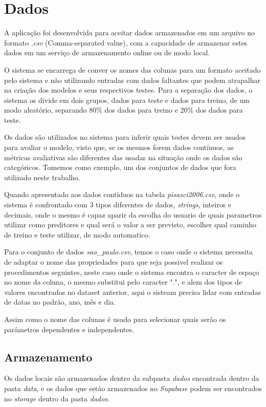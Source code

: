 \documentclass[
    12pt,               %
    openright,          %
    oneside,            %
    a4paper,            %
    english,            %
    brazil              %
    ]{abntex2}
\begin{document}
\section{Dados}

A aplicação foi desenvolvida para aceitar dados armazenados em um arquivo no formato \textit{.csv} (Comma-separated value), com a 
capacidade de armazenar estes dados em um serviço de armazenamento online ou de modo local.

O sistema se encarrega de conver os nomes das colunas para um formato aceitado pelo sistema e não utilizando entradas com dados 
faltantes que podem atrapalhar na criação dos modelos e seus respectivos testes. Para a separação dos dados, o sistema os divide 
em dois grupos, dados para teste e dados para treino, de um modo aleatório, separando 80\% dos dados para treino e 20\% dos 
dados para teste.

Os dados são utilizados no sistema para inferir quais testes devem ser usados para avaliar o modelo, visto que, se os mesmos forem dados
contínuos, as métricas avaliativas são diferentes das usadas na situação onde os dados são categóricos. Tomemos como exemplo, um dos
conjuntos de dados que fora utilizado neste trabalho. 

Quando apresentado aos dados contiduos na tabela \textit{pisasci2006.csv}, onde o sistema é confrontado com 3 tipos diferentes de 
dados, \textit{strings}, inteiros e decimais, onde o mesmo é capaz aparir da escolha do usuario de quais parametros utilizar 
como preditores e qual será o valor a ser previsto, escolher qual caminho de treino e teste utilizar, de modo automatico.

Para o conjunto de dados \textit{sao\_paulo.csv}, temos o caso onde o sistema necessita de adaptar o nome das propriedades para que
seja possivel realizar os procedimentos seguintes, neste caso onde o sistema encontra o caracter de espaço no nome da coluna, o
mesmo substitui pelo caracter ".", e alem dos tipos de valores encontrados no dataset anterior, aqui o sisteam precisa lidar com
entradas de datas no padrão, ano, mês e dia.

Assim como o nome das colunas é usado para selecionar quais serão os parâmetros dependentes e independentes.

\subsection{Armazenamento}

Os dados locais são armazenados dentro da subpasta \textit{dados} encontrada dentro da pasta \textit{data}, e os dados que estão 
armazenados no \textit{Supabase} podem ser encontrados no \textit{storage} dentro da pasta \textit{dados}. 
\end{document}
